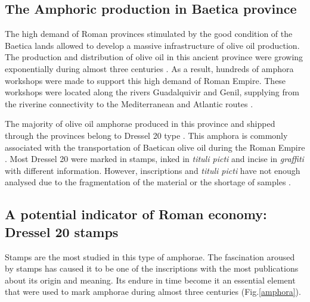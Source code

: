 \documentclass[review]{elsarticle}
\newcommand{\memo}[2]{\textcolor{#1}{#2}}
\newcommand{\xavi}[1]{\memo{magenta}{XRC: #1\\}}
\begin{document}
\subsection{The Amphoric production in Baetica province}


The high demand of Roman provinces stimulated by the good condition of the Baetica lands allowed to develop a massive infrastructure of olive oil production. The production and distribution of olive oil in this ancient province were growing exponentially during almost three centuries \citep{remesal_concierto}. As a result, hundreds of amphora workshops were made to support this high demand of Roman Empire. These workshops were located along the rivers Guadalquivir and Genil, supplying from the riverine connectivity to the Mediterranean and Atlantic routes \citep{garcia_vargas_enrique_formal_2010}.

The majority of olive oil amphorae produced in this province and shipped through the provinces belong to Dressel 20 type \citep{dressel_ricerche_1878,
millet_anforas_1998}. This amphora is commonly associated with the transportation of Baetican olive oil during the Roman Empire \citep{berni_millet_epigrafianforica_2008}. Most Dressel 20 were marked in stamps, inked in \textit{tituli picti} and incise in \textit{graffiti} with different information. However, inscriptions and \textit{tituli picti} have not enough analysed due to the fragmentation of the material or the shortage of samples \citep{aguilera_evolucion_2007,rovira_guardiola_grafitos_2007}. 


\subsection{A potential indicator of Roman economy: Dressel 20 stamps}

Stamps are the most studied in this type of amphorae. The fascination aroused by stamps has caused it to be one of the inscriptions with the most publications about its origin and meaning. Its endure in time become it an essential element that were used to mark amphorae during almost three centuries \citep{remesal_sellar_2016} (Fig.\ref{amphora}). 
\end{document}
